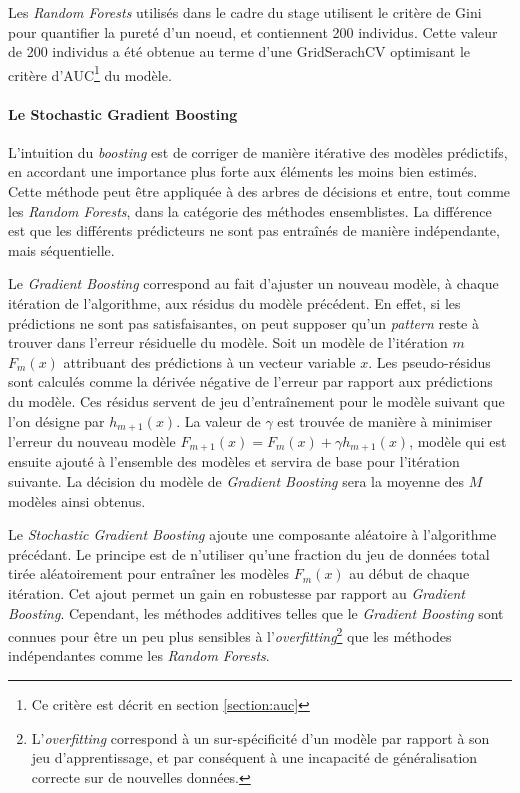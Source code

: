 \documentclass[french]{llncs}
\begin{document}
Les \textit{Random Forests} utilisés dans le cadre du stage utilisent le critère de Gini pour quantifier la pureté d'un noeud, et contiennent 200 individus. Cette valeur de 200 individus a été obtenue au terme d'une GridSerachCV optimisant le critère d'AUC\footnote{Ce critère est décrit en section \ref{section:auc}} du modèle.

\paragraph{Le Stochastic Gradient Boosting}

L'intuition du \textit{boosting} est de corriger de manière itérative des modèles prédictifs, en accordant une importance plus forte aux éléments les moins bien estimés. Cette méthode peut être appliquée à des arbres de décisions et entre, tout comme les \textit{Random Forests}, dans la catégorie des méthodes ensemblistes. La différence est que les différents prédicteurs ne sont pas entraînés de manière indépendante, mais séquentielle.

Le \textit{Gradient Boosting} correspond au fait d'ajuster un nouveau modèle, à chaque itération de l'algorithme, aux résidus du modèle précédent. En effet, si les prédictions ne sont pas satisfaisantes, on peut supposer qu'un \textit{pattern} reste à trouver dans l'erreur résiduelle du modèle. Soit un modèle de l'itération $m$ $F_m(x)$ attribuant des prédictions à un vecteur variable $x$. Les pseudo-résidus sont calculés comme la dérivée négative de l'erreur par rapport aux prédictions du modèle. Ces résidus servent de jeu d'entraînement pour le modèle suivant que l'on désigne par $h_{m+1}(x)$. La valeur de $\gamma$ est trouvée de manière à minimiser l'erreur du nouveau modèle $F_{m+1}(x) = F_m(x) + \gamma h_{m+1}(x)$, modèle qui est ensuite ajouté à l'ensemble des modèles et servira de base pour l'itération suivante. 
La décision du modèle de \textit{Gradient Boosting} sera la moyenne des $M$ modèles ainsi obtenus.



Le \textit{Stochastic Gradient Boosting } ajoute une composante aléatoire à l'algorithme précédant. Le principe est de n'utiliser qu'une fraction du jeu de données total tirée aléatoirement pour entraîner les modèles $F_m(x)$ au début de chaque itération.
Cet ajout permet un gain en robustesse par rapport au \textit{Gradient Boosting}. Cependant, les méthodes additives telles que le \textit{Gradient Boosting} sont connues pour être un peu plus sensibles à l'\textit{overfitting}\footnote{L'\textit{overfitting} correspond à un sur-spécificité d'un modèle par rapport à son jeu d'apprentissage, et par conséquent à une incapacité de généralisation correcte sur de nouvelles données.} que les méthodes indépendantes comme les \textit{Random Forests}.
\end{document}
